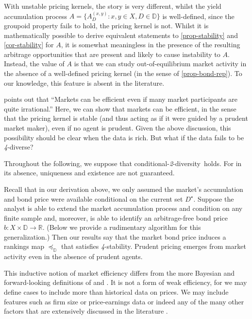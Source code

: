 \documentclass[ecta,nameyear,draft]{econsocart}
\newcommand{\R}{\mathbb R}
\newcommand{\mbbd}{{\mathds D}}
\newcommand{\past}{{D^\star}}
\newcommand{\xy}{{(x, y)}}
\newcommand{\stability}{\textit{4}-\textup{{stability}}}
\newcommand{\condtwodiv}{\textup{conditional-\textit{2}-diversity}}
\theoremstyle{plain}
\theoremstyle{remark}
\begin{document}
With unstable pricing kernels, the story is very different, whilst the yield
accumulation process $A = \{A^{\xy}_D : x, y \in X, D \in \mbbd\}$ is
well-defined, since the groupoid property fails to hold, the pricing kernel is
not. Whilst it is mathematically possible to derive equivalent statements to
\cref{prop-stability} and \cref{cor-stability} for $A$, it is somewhat
meaningless in the presence of the resulting arbitrage opportunities that are
present and likely to cause instability to $A$.  Instead, the value of $A$ is
that we can study out-of-equilibrium market activity in the absence of a
well-defined pricing kernel (in the sense of \cref{prop-bond-rep}). To our
knowledge, this feature is absent in the literature.

 points out that ``Markets can be efficient
even if many market participants are quite irrational.'' Here, we can show that
markets can be efficient, in the sense that the pricing kernel is stable (and
thus acting as if it were guided by a prudent market maker), even if no agent
is prudent. Given the above discussion, this possibility should be clear when
the data is rich.  But what if the data fails to be \emph{4}-diverse?

Throughout the following, we suppose that \condtwodiv\ holds. For in its
absence, uniqueness and existence are not guaranteed.

Recall that in our derivation above, we only assumed the market's accumulation
and bond price were available conditional on the current set $\past$. Suppose
the analyst is able to extend the market accumulation process and condition on
any finite sample and, moreover, is able to identify an arbitrage-free bond
price $b: X \times \mbbd \rightarrow \R$. (Below we provide a rudimentary
algorithm for this generalization.) Then our results say that the market bond
price induces a rankings map $\preceq_{\mbbd}$ that satisfies \stability.
Prudent pricing emerges from market activity even in the absence of prudent
agents.

This inductive notion of market efficiency differs from the more Bayesian and
forward-looking definitions of \citet{fama1970efficient} and
\citet{malkiel2003efficient}. It is not a form of weak efficiency, for we may
define cases to include more than historical data on prices. We may include
features such as firm size or price-earnings data or indeed any of the many
other factors that are extensively discussed in the literature
\citep{fama2015five,harvey2021lucky,gu2020empirical}.
\end{document}
